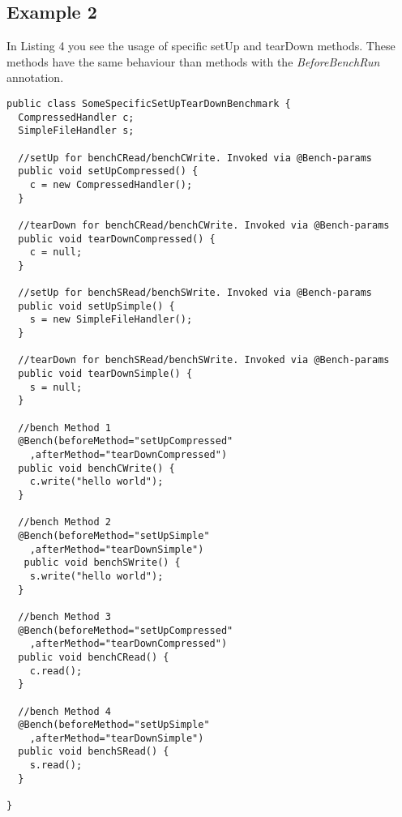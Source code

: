 \documentclass[12pt]{article}
\begin{document}
\subsection{Example 2}
In Listing 4 you see the usage of specific setUp and tearDown methods. These methods have the same behaviour than methods with the \emph{BeforeBenchRun} annotation.
\begin{lstlisting}[caption=Perfidix 2.0]
public class SomeSpecificSetUpTearDownBenchmark {
  CompressedHandler c;
  SimpleFileHandler s;

  //setUp for benchCRead/benchCWrite. Invoked via @Bench-params
  public void setUpCompressed() {
	c = new CompressedHandler();
  }

  //tearDown for benchCRead/benchCWrite. Invoked via @Bench-params
  public void tearDownCompressed() {
	c = null;
  }

  //setUp for benchSRead/benchSWrite. Invoked via @Bench-params
  public void setUpSimple() {
	s = new SimpleFileHandler();
  }

  //tearDown for benchSRead/benchSWrite. Invoked via @Bench-params
  public void tearDownSimple() {
	s = null;
  }

  //bench Method 1	
  @Bench(beforeMethod="setUpCompressed"
  	,afterMethod="tearDownCompressed")
  public void benchCWrite() {
	c.write("hello world");
  }
  
  //bench Method 2
  @Bench(beforeMethod="setUpSimple"
  	,afterMethod="tearDownSimple")
   public void benchSWrite() {
	s.write("hello world");
  }
  
  //bench Method 3	
  @Bench(beforeMethod="setUpCompressed"
  	,afterMethod="tearDownCompressed")
  public void benchCRead() {
	c.read();
  }

  //bench Method 4	
  @Bench(beforeMethod="setUpSimple"
  	,afterMethod="tearDownSimple")
  public void benchSRead() {
	s.read();
  }

}
\end{lstlisting}
\end{document}
